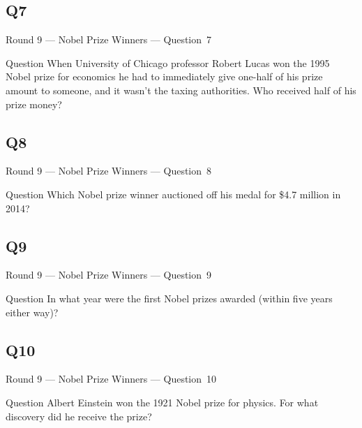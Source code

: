 \documentclass[11pt]{beamer}
\begin{document}
\subsection*{Q7}
\begin{frame}[t]{Round 9 --- Nobel Prize Winners --- \mbox{Question 7}}
\vspace{-0.5em}
\begin{block}{Question}
When University of Chicago professor Robert Lucas won the 1995 Nobel prize for economics he had to immediately give one-half of his prize amount to someone, and it wasn't the taxing authorities. Who received half of his prize money?
\end{block}
\end{frame}
\subsection*{Q8}
\begin{frame}[t]{Round 9 --- Nobel Prize Winners --- \mbox{Question 8}}
\vspace{-0.5em}
\begin{block}{Question}
Which Nobel prize winner auctioned off his medal for \$4.7 million in 2014?
\end{block}
\end{frame}
\subsection*{Q9}
\begin{frame}[t]{Round 9 --- Nobel Prize Winners --- \mbox{Question 9}}
\vspace{-0.5em}
\begin{block}{Question}
In what year were the first Nobel prizes awarded (within five years either way)?
\end{block}
\end{frame}
\subsection*{Q10}
\begin{frame}[t]{Round 9 --- Nobel Prize Winners --- \mbox{Question 10}}
\vspace{-0.5em}
\begin{block}{Question}
Albert Einstein won the 1921 Nobel prize for physics. For what discovery did he receive the prize?
\end{block}
\end{frame}
\end{document}
